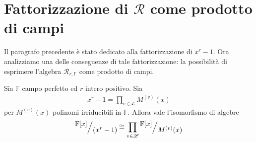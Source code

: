 \section{Fattorizzazione di $\mathcal{R}$ come prodotto di campi}

Il paragrafo precedente è stato dedicato alla fattorizzazione di $x^r - 1$. Ora analizziamo una delle conseguenze di tale fattorizzazione: la possibilità di esprimere l'algebra $\mathcal{R}_{r,\mathbb{F}}$ come prodotto di campi.
\begin{teorema}\label{teo:teoremaGamma}
   Sia $\mathbb{F}$ campo perfetto ed $r$ intero positivo. Sia 
   \begin{align*}
        x^r-1 = \prod_{v\in \mathscr{L}} M^{(v)}(x) 
   \end{align*}
   per $M^{(v)}(x)$ polinomi irriducibili in $\mathbb{F}$. Allora vale l'isomorfismo di algebre
   \begin{align*}
      \quotient{\mathbb{F} \lbrack x \rbrack  }{(x^{r} - 1)}
      \cong
      \prod_{v\in \mathscr{L}} \quotient{\mathbb{F} \lbrack x \rbrack  }{M^{(v)}(x)}
   \end{align*}
\end{teorema}
